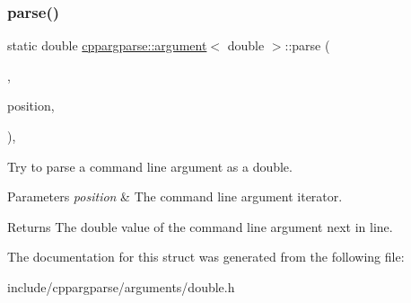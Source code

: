 \subsubsection{\texorpdfstring{parse()}{parse()}}
{\footnotesize\ttfamily static double \hyperlink{structcppargparse_1_1argument}{cppargparse\+::argument}$<$ double $>$\+::parse (\begin{DoxyParamCaption}\item[{const \hyperlink{types_8h_a80adf2418b7ce9fe616698efa7533ecf}{types\+::\+Command\+Line\+\_\+t} \&}]{,  }\item[{const \hyperlink{types_8h_a43b4f43f8940de1bf09ced6f1b668053}{types\+::\+Command\+Line\+Position\+\_\+t} \&}]{position,  }\item[{const \hyperlink{types_8h_a003c660afe2ee9c6cc39aea966e8926d}{types\+::\+Command\+Line\+Arguments\+\_\+t} \&}]{ }\end{DoxyParamCaption})\hspace{0.3cm}{\ttfamily [inline]}, {\ttfamily [static]}}



Try to parse a command line argument as a double. 


\begin{DoxyParams}{Parameters}
{\em position} & The command line argument iterator.\\
\hline
\end{DoxyParams}
\begin{DoxyReturn}{Returns}
The double value of the command line argument next in line. 
\end{DoxyReturn}


The documentation for this struct was generated from the following file\+:\begin{DoxyCompactItemize}
\item 
include/cppargparse/arguments/double.\+h\end{DoxyCompactItemize}

